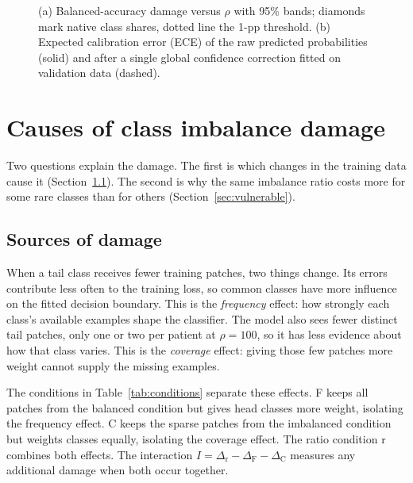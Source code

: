 \documentclass[11pt]{article}
\begin{document}
\begin{figure}[t]
\caption{(a) Balanced-accuracy damage versus $\rho$ with 95\% bands; diamonds mark native class shares, dotted line the 1-pp threshold. (b) Expected calibration error (ECE) of the raw predicted probabilities (solid) and after a single global confidence correction fitted on validation data (dashed).}
\label{fig:damage}
\end{figure}

\section{Causes of class imbalance damage}
\label{sec:cause}
Two questions explain the damage. The first is which changes in the training data cause it (Section~\ref{sec:sources}). The second is why the same imbalance ratio costs more for some rare classes than for others (Section~\ref{sec:vulnerable}).

\subsection{Sources of damage}
\label{sec:sources}
When a tail class receives fewer training patches, two things change. Its errors contribute less often to the training loss, so common classes have more influence on the fitted decision boundary. This is the \emph{frequency} effect: how strongly each class's available examples shape the classifier. The model also sees fewer distinct tail patches, only one or two per patient at $\rho=100$, so it has less evidence about how that class varies. This is the \emph{coverage} effect: giving those few patches more weight cannot supply the missing examples.

The conditions in Table~\ref{tab:conditions} separate these effects. F keeps all patches from the balanced condition but gives head classes more weight, isolating the frequency effect. C keeps the sparse patches from the imbalanced condition but weights classes equally, isolating the coverage effect. The ratio condition r combines both effects. The interaction $I=\Delta_\mathrm{r}-\Delta_\mathrm{F}-\Delta_\mathrm{C}$ measures any additional damage when both occur together.
\end{document}
